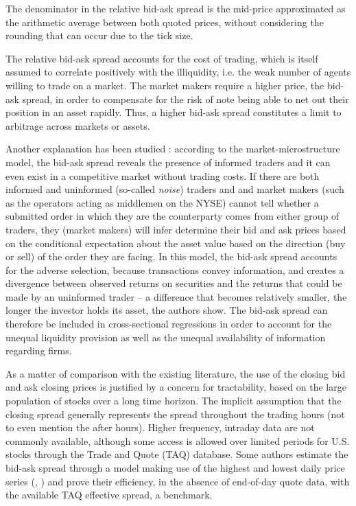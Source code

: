 The denominator in the relative bid-ask spread is the mid-price approximated as the arithmetic average between both quoted prices, without considering the rounding that can occur due to the tick size.

The relative bid-ask spread accounts for the cost of trading, which is itself assumed to correlate positively with the illiquidity, i.e. the weak number of agents willing to trade on a market. The market makers require a higher price, the bid-ask spread, in order to compensate for the risk of note being able to net out their position in an asset rapidly. Thus, a higher bid-ask spread constitutes a limit to arbitrage across markets or assets.

Another explanation has been studied : according to the \textcite{Glosten1985} market-microstructure model, the bid-ask spread reveals the presence of informed traders and it can even exist in a competitive market without trading costs. If there are both informed and uninformed (so-called \emph{noise}) traders and and market makers (such as the operators acting as middlemen on the NYSE) cannot tell whether a submitted order in which they are the counterparty comes from either group of traders, they (market makers) will infer determine their bid and ask prices based on the conditional expectation about the asset value based on the direction (buy or sell) of the order they are facing. In this model, the bid-ask spread accounts for the adverse selection, because transactions convey information, and creates a divergence between observed returns on securities and the returns that could be made by an uninformed trader -- a difference that becomes relatively smaller, the longer the investor holds its asset, the authors show. The bid-ask spread can therefore be included in cross-sectional regressions in order to account for the unequal liquidity provision as well as the unequal availability of information regarding firms.

As a matter of comparison with the existing literature, the use of the closing bid and ask closing prices is justified by a concern for tractability, based on the large population of stocks over a long time horizon. The implicit assumption that the closing spread generally represents the spread throughout the trading hours (not to even mention the after hours). Higher frequency, intraday data are not commonly available, although some access is allowed over limited periods for U.S. stocks through the Trade and Quote (TAQ) database. Some authors estimate the bid-ask spread through a model making use of the highest and lowest daily price series (\textcite{Corwin2012}, \textcite{Abdi2017}) and prove their efficiency, in the absence of end-of-day quote data, with the available TAQ effective spread, a benchmark.
